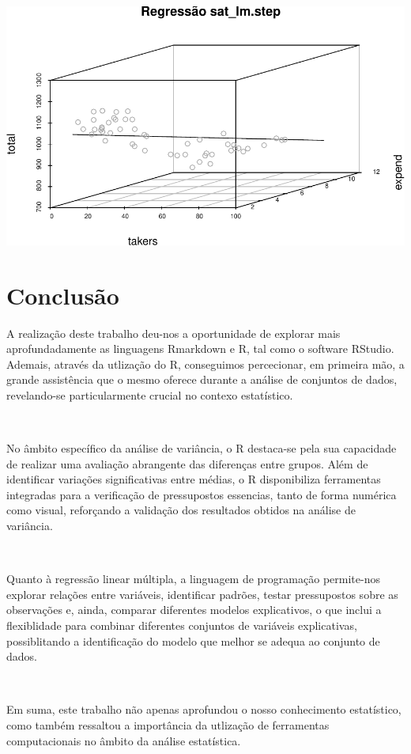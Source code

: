 \documentclass[]{article}
\begin{document}
\begin{Shaded}
\begin{Highlighting}[]
\SpecialCharTok{$}\SpecialCharTok{$}\SpecialCharTok{$}\SpecialCharTok{$}
              \NormalTok{, } \NormalTok{)}
\end{Highlighting}
\end{Shaded}

\includegraphics{AEII_main_files/figure-latex/unnamed-chunk-40-1.pdf}

\newpage
\section{Conclusão}

A realização deste trabalho deu-nos a oportunidade de explorar mais
aprofundadamente as linguagens Rmarkdown e R, tal como o software
RStudio. Ademais, através da utlização do R, conseguimos percecionar, em
primeira mão, a grande assistência que o mesmo oferece durante a análise
de conjuntos de dados, revelando-se particularmente crucial no contexo
estatístico.

\(\ \)

No âmbito específico da análise de variância, o R destaca-se pela sua
capacidade de realizar uma avaliação abrangente das diferenças entre
grupos. Além de identificar variações significativas entre médias, o R
disponibiliza ferramentas integradas para a verificação de pressupostos
essencias, tanto de forma numérica como visual, reforçando a validação
dos resultados obtidos na análise de variância.

\(\ \)

Quanto à regressão linear múltipla, a linguagem de programação
permite-nos explorar relações entre variáveis, identificar padrões,
testar pressupostos sobre as observações e, ainda, comparar diferentes
modelos explicativos, o que inclui a flexiblidade para combinar
diferentes conjuntos de variáveis explicativas, possiblitando a
identificação do modelo que melhor se adequa ao conjunto de dados.

\(\ \)

Em suma, este trabalho não apenas aprofundou o nosso conhecimento
estatístico, como também ressaltou a importância da utlização de
ferramentas computacionais no âmbito da análise estatística.
\end{document}

